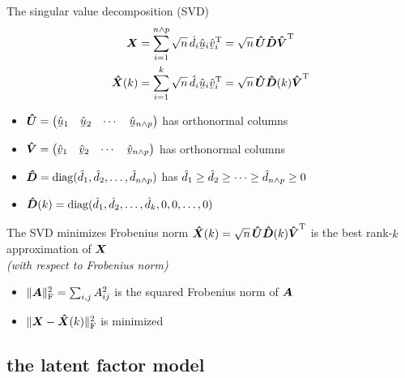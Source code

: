 \documentclass{beamer}
\begin{document}
\begin{frame}{The singular value decomposition (SVD)}
  \begin{gather*}
    \mX = \sum_{i=1}^{n \wedge p} \sqrt{n} \, \hd_i \vhu_i \vhv_i^\trans = \sqrt{n} \, \mhU \mhD \mhV^\trans \\
    \mhX(k) = \sum_{i=1}^k \sqrt{n} \, \hd_i \vhu_i \vhv_i^\trans = \sqrt{n} \, \mhU \mhD(k) \mhV^\trans
  \end{gather*}

  \begin{itemize}
  \item $\mhU = \left(\begin{matrix} \vhu_1 & \vhu_2 & \cdots & \vhu_{n \wedge p} \end{matrix}\right)$ has orthonormal columns
  \item $\mhV = \left(\begin{matrix} \vhv_1 & \vhv_2 & \cdots & \vhv_{n \wedge p} \end{matrix}\right)$ has orthonormal columns
  \item $\boldsymbol{\hat D} = \operatorname*{diag}(\hat d_1, \hat d_2, \ldots, \hat d_{n \wedge p})$ has 
    $\hat d_1 \geq \hat d_2 \geq \cdots \geq \hat d_{n \wedge p} \geq 0$
  \item $\boldsymbol{\hat D}(k) = \operatorname*{diag}(\hat d_1, \hat d_2, \ldots, \hat d_k, 0, 0, \ldots, 0)$ 
  \end{itemize}
\end{frame}

\begin{frame}{The SVD minimizes Frobenius norm}
  $\boldsymbol{\hat X}(k) = \sqrt{n} \, \boldsymbol{\hat U} \boldsymbol{\hat D}(k) \boldsymbol{\hat V}^{\mathrm{T}}$ is the best rank-$k$ approximation of $\boldsymbol{X}$ \\
  {\small \textit{(with respect to Frobenius norm)}}

  \begin{itemize}
  \item $\| \boldsymbol{A} \|_{\text{F}}^2 = \sum_{i,j} A_{ij}^2$ is the squared Frobenius norm of $\boldsymbol{A}$
  \item $\| \boldsymbol{X} - \boldsymbol{\hat X}(k) \|_{\text{F}}^2$ is minimized
  \end{itemize}
\end{frame}

\subsection{the latent factor model}
\end{document}
